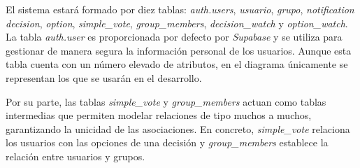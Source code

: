 El sistema estará formado por diez tablas: \textit{auth.users}, \textit{usuario}, \textit{grupo}, \textit{notification} \textit{decision}, \textit{option}, \textit{simple\_vote}, \textit{group\_members}, \textit{decision\_watch} y \textit{option\_watch}. La tabla \textit{auth.user} es proporcionada por defecto por \textit{Supabase} y se utiliza para gestionar de manera segura la información personal de los usuarios. Aunque esta tabla cuenta con un número elevado de atributos, en el diagrama únicamente se representan los que se usarán en el desarrollo. \\

Por su parte, las tablas \textit{simple\_vote} y \textit{group\_members} actuan como tablas intermedias que permiten modelar relaciones de tipo muchos a muchos, garantizando la unicidad de las asociaciones. En concreto, \textit{simple\_vote} relaciona los usuarios con las opciones de una decisión y \textit{group\_members} establece la relación entre usuarios y grupos. \\ 

